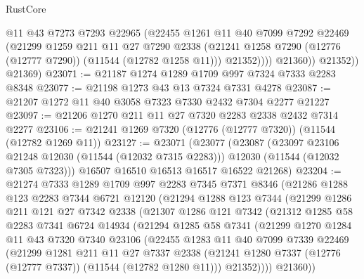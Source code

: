 \begin{lexlean}{RustCore}
\begin{coremodule}
                  @11
                  @43
                  @7273
                  @7293
                  @22965
                  (@22455
                    @1261
                    @11
                    @40
                    @7099
                    @7292
                    @22469
                    (@21299
                      @1259
                      @211
                      @11
                      @27
                      @7290
                      @2338
                      (@21241 @1258 @7290 (@12776 (@12777 @7290)) (@11544 (@12782 @1258 @11)))
                      @21352))))
              @21360))
          @21352))
      @21369)
@23071 := @21187 @1274 @1289 @1709 @997 @7324 @7333 @2283 @8348
@23077 := @21198 @1273 @43 @13 @7324 @7331 @4278
@23087 := @21207 @1272 @11 @40 @3058 @7323 @7330 @2432 @7304 @2277 @21227
@23097 := @21206 @1270 @211 @11 @27 @7320 @2283 @2338 @2432 @7314 @2277
@23106 := @21241 @1269 @7320 (@12776 (@12777 @7320)) (@11544 (@12782 @1269 @11))
@23127 := @23071
    (@23077
      (@23087
        (@23097 @23106 @21248 @12030 (@11544 (@12032 @7315 @2283)))
        @12030
        (@11544 (@12032 @7305 @7323)))
      @16507
      @16510
      @16513
      @16517
      @16522
      @21268)
@23204 := @21274
    @7333
    @1289
    @1709
    @997
    @2283
    @7345
    @7371
    @8346
    (@21286
      @1288
      @123
      @2283
      @7344
      @6721
      @12120
      (@21294
        @1288
        @123
        @7344
        (@21299
          @1286
          @211
          @121
          @27
          @7342
          @2338
          (@21307
            @1286
            @121
            @7342
            (@21312
              @1285
              @58
              @2283
              @7341
              @6724
              @14934
              (@21294
                @1285
                @58
                @7341
                (@21299
                  @1270
                  @1284
                  @11
                  @43
                  @7320
                  @7340
                  @23106
                  (@22455
                    @1283
                    @11
                    @40
                    @7099
                    @7339
                    @22469
                    (@21299
                      @1281
                      @211
                      @11
                      @27
                      @7337
                      @2338
                      (@21241 @1280 @7337 (@12776 (@12777 @7337)) (@11544 (@12782 @1280 @11)))
                      @21352))))
              @21360))

\end{coremodule}
\end{lexlean}
